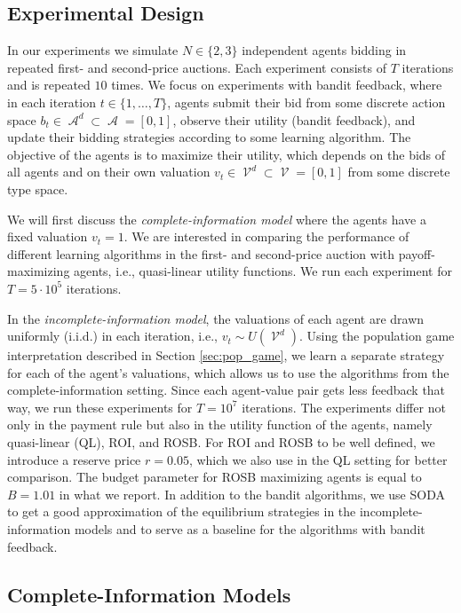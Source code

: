 \documentclass{article}
\DeclareMathOperator{\Acal}{\mathcal{A}}
\DeclareMathOperator{\Vcal}{\mathcal{V}}
\begin{document}
\subsection{Experimental Design} \label{sec:exp_design}
In our experiments we simulate $N \in \{2, 3\}$ independent agents bidding in repeated first- and second-price auctions. Each experiment consists of $T$ iterations and is repeated $10$ times.
We focus on experiments with bandit feedback, where in each iteration $t \in \lbrace 1, \dots, T \rbrace$, agents submit their bid from some discrete action space $b_t \in \Acal^d \subset \Acal = [0,1]$, observe their utility (bandit feedback), and update their bidding strategies according to some learning algorithm. The objective of the agents is to maximize their utility, which depends on the bids of all agents and on their own valuation $v_t \in \Vcal^d \subset \Vcal = [0,1]$ from some discrete type space.

We will first discuss the \textit{complete-information model} where the agents have a fixed valuation $v_t=1$. We are interested in comparing the performance of different learning algorithms in the first- and second-price auction with payoff-maximizing agents, i.e., quasi-linear utility functions. We run each experiment for $T=5\cdot 10^5$ iterations.

In the \textit{incomplete-information model}, the valuations of each agent are drawn uniformly (i.i.d.) in each iteration, i.e., $v_t \sim U(\Vcal^d)$. Using the population game interpretation described in Section \ref{sec:pop_game}, we learn a separate strategy for each of the agent's valuations, which allows us to use the algorithms from the complete-information setting. 
Since each agent-value pair gets less feedback that way, we run these experiments for $T = 10^7$ iterations. The experiments differ not only in the payment rule but also in the utility function of the agents, namely quasi-linear (QL), ROI, and ROSB. For ROI and ROSB to be well defined, we introduce a reserve price $r=0.05$, which we also use in the QL setting for better comparison. The budget parameter for ROSB maximizing agents is equal to $B = 1.01$ in what we report. In addition to the bandit algorithms, we use SODA to get a good approximation of the equilibrium strategies in the incomplete-information models and to serve as a baseline for the algorithms with bandit feedback. 

\subsection{Complete-Information Models} \label{sec:results_compl_info}
\end{document}
